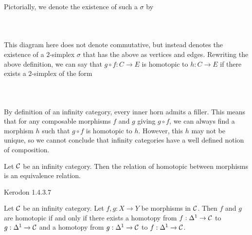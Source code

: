 \documentclass[a4paper]{article}
\begin{document}
Pictorially, we denote the existence of such a $\sigma$ by \\~\\
\\~\\

This diagram here does not denote commutative, but instead denotes the existence of a $2$-simplex $\sigma$ that has the above as vertices and edges. Rewriting the above definition, we can say that $g\circ f:C\to E$ is homotopic to $h:C\to E$ if there exists a $2$-simplex of the form \\~\\
\\~\\
By definition of an infinity category, every inner horn admits a filler. This means that for any composable morphisms $f$ and $g$ giving $g\circ f$, we can always find a morphism $h$ such that $g\circ f$ is homotopic to $h$. However, this $h$ may not be unique, so we cannot conclude that infinity categories have a well defined notion of composition. 

\begin{lmm}{}{} Let $\mathcal{C}$ be an infinity category. Then the relation of homotopic between morphisms is an equivalence relation. 
\end{lmm}

Kerodon 1.4.3.7

\begin{prp}{}{} Let $\mathcal{C}$ be an infinity category. Let $f,g:X\to Y$ be morphisms in $\mathcal{C}$. Then $f$ and $g$ are homotopic if and only if there exists a homotopy from $f:\Delta^1\to\mathcal{C}$ to $g:\Delta^1\to\mathcal{C}$ and a homotopy from $g:\Delta^1\to\mathcal{C}$ to $f:\Delta^1\to\mathcal{C}$. 
\end{prp}
\end{document}
